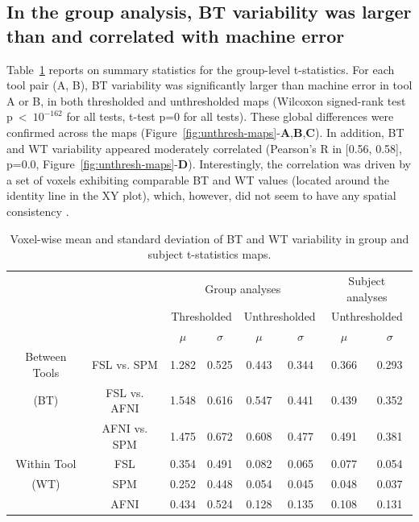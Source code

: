 \documentclass[11pt,onecolumn]{article}
\begin{document}
\subsection{In the group analysis, BT variability was larger than and correlated with machine error}

Table~\ref{table:pipeline-stats} reports on summary statistics for the
group-level t-statistics. For each tool pair (A, B), BT variability was
significantly larger than machine error in tool A or B, in both thresholded
and unthresholded maps (Wilcoxon signed-rank test p~\textless~$10^{-162}$
for all tests, t-test p=0 for all tests). These global differences were
confirmed across the maps (Figure~\ref{fig:unthresh-maps}-\textbf{A},\textbf{B},\textbf{C}). 
In addition, BT and WT variability appeared moderately correlated (Pearson's R
in [0.56, 0.58], p=0.0, Figure~\ref{fig:unthresh-maps}-\textbf{D}). Interestingly, the correlation 
was driven by a set of voxels exhibiting comparable BT and
WT values (located around the identity line in the XY plot), which, however, did not seem to have 
any spatial consistency .


\setlength{\tabcolsep}{5pt}
\begin{table}[h]
    \centering
    \begin{tabular}{cccccc|cc}
        \toprule
        && \multicolumn{4}{c|}{Group analyses} & \multicolumn{2}{c}{Subject analyses}\\
        \multirow{2}{*}{}& {} & \multicolumn{2}{c}{Thresholded} & \multicolumn{2}{c|}{Unthresholded} & \multicolumn{2}{c}{Unthresholded} \\
        {} & {} & $\mu$ & $\sigma$ & $\mu$ & $\sigma$ & $\mu$ & $\sigma$ \\
        \midrule
        \rowcolor{lightgray!50}
        {Between Tools} & FSL vs. SPM        &  1.282       & 0.525      & 0.443     & 0.344  & 0.366       & 0.293     \\
        \rowcolor{lightgray!50}
        {(BT)} & FSL vs. AFNI                &  1.548       & 0.616      & 0.547     & 0.441  & 0.439       & 0.352     \\
        \rowcolor{lightgray!50} 
        {} & AFNI vs. SPM                    &  1.475       & 0.672      & 0.608     & 0.477  & 0.491       & 0.381     \\
        {Within Tool} & FSL                  &  0.354       & 0.491      & 0.082     & 0.065  & 0.077       & 0.054     \\
        {(WT)}   & SPM                       &  0.252       & 0.448      & 0.054     & 0.045  & 0.048       & 0.037     \\
        {}   & AFNI                          &  0.434       & 0.524      & 0.128     & 0.135  & 0.108       & 0.131     \\
        \bottomrule
    \end{tabular}
    \caption{Voxel-wise mean and standard deviation of BT and WT variability
    in group and subject t-statistics maps. }
    \label{table:pipeline-stats}
\end{table}
\end{document}
